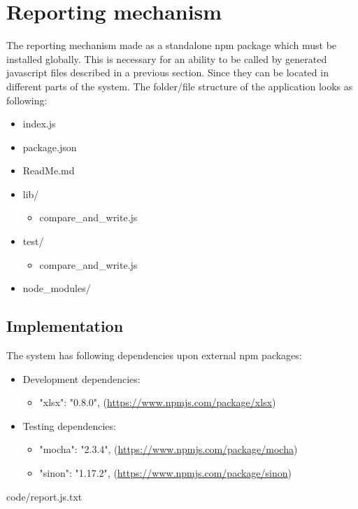 {\section{Reporting mechanism}
\label{sec:report}
The reporting mechanism made as a standalone npm package which must be installed globally. This is necessary for an ability to be called by generated javascript files described in a previous section. Since they can be located in different parts of the system. 
The folder/file structure of the application looks as following:
\begin{itemize}
	\item index.js
	\item package.json
	\item ReadMe.md
	\item lib/
	\begin{itemize}
		\item compare\_and\_write.js
	\end{itemize}
	\item test/
	\begin{itemize}
		\item compare\_and\_write.js
	\end{itemize}
	\item node\_modules/
\end{itemize}

\subsection{Implementation}
The system has following dependencies upon external npm packages:
\begin{itemize}
	\item Development dependencies:
	\begin{itemize}
		\item "xlsx": "0.8.0", (\url{https://www.npmjs.com/package/xlsx})
	\end{itemize}
	\item Testing dependencies:
	\begin{itemize}
		\item "mocha": "2.3.4", (\url{https://www.npmjs.com/package/mocha})
		\item "sinon": "1.17.2", (\url{https://www.npmjs.com/package/sinon})
	\end{itemize}
\end{itemize}
	


{code/report.js.txt}

}

